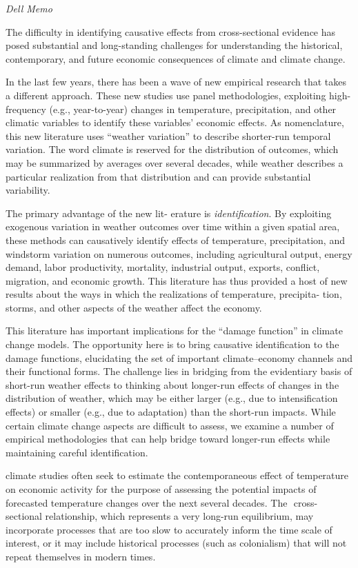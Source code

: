 \documentclass[
]{book}
\begin{document}
\emph{Dell Memo}

The
difficulty in identifying causative effects
from cross-sectional evidence has posed
substantial and long-standing challenges for
understanding the historical, contemporary,
and future economic consequences of climate and climate change.

In the last few years, there has been a wave
of new empirical research that takes a different approach.
These new studies use panel
methodologies, exploiting high-frequency
(e.g., year-to-year) changes in temperature,
precipitation, and other climatic variables to
identify these variables' economic effects.
As nomenclature, this new literature uses
``weather variation'' to describe shorter-run
temporal variation. The word climate is
reserved for the distribution of outcomes,
which may be summarized by averages over
several decades, while weather describes a
particular realization from that distribution
and can provide substantial variability.

The primary advantage of the new lit-
erature is \emph{identification}. By exploiting
exogenous variation in weather outcomes
over time within a given spatial area, these
methods can causatively identify effects of
temperature, precipitation, and windstorm
variation on numerous outcomes, including
agricultural output, energy demand, labor
productivity, mortality, industrial output,
exports, conflict, migration, and economic
growth. This literature has thus provided a
host of new results about the ways in which
the realizations of temperature, precipita-
tion, storms, and other aspects of the weather
affect the economy.

This literature has important implications for the ``damage function''
in climate change models.
The opportunity here is to bring causative identification to the damage functions, elucidating
the set of important climate--economy channels and their functional forms.
The challenge lies in bridging from the evidentiary
basis of short-run weather effects to thinking
about longer-run effects of changes in the
distribution of weather, which may be either
larger (e.g., due to intensification effects)
or smaller (e.g., due to adaptation) than the
short-run impacts. While certain climate
change aspects are difficult to assess, we
examine a number of empirical methodologies that can help bridge toward longer-run
effects while maintaining careful identification.

climate studies often seek
to estimate the contemporaneous effect of
temperature on economic activity for the
purpose of assessing the potential impacts
of forecasted temperature changes over the
next several decades. The ­
cross-sectional
relationship, which represents a very
long-run equilibrium, may incorporate processes
that are too slow to accurately inform
the time scale of interest, or it may include
historical processes (such as colonialism) that
will not repeat themselves in modern times.
\end{document}
